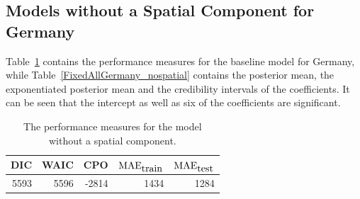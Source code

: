 \subsection{Models without a Spatial Component for Germany}\label{sec:nospatial_germany}
Table~\ref{allGermany_nospatial} contains the performance measures for the baseline model for Germany, while Table~\ref{FixedAllGermany_nospatial} contains the posterior mean, the exponentiated posterior mean and the credibility intervals of the coefficients. It can be seen that the intercept as well as six of the coefficients are significant.
\begin{table}[H] 
\caption{The performance measures for the model without a spatial component. \label{allGermany_nospatial}}
\begin{tabular}{r r r r r}
\toprule
\textbf{DIC}	& \textbf{WAIC} & \textbf{CPO} & \textbf{$\hbox{MAE}_{\hbox{train}}$} & \textbf{$\hbox{MAE}_{\hbox{test}}$}\\
\midrule
5593 & 5596 & -2814 & 1434 & 1284 \\
\bottomrule
\end{tabular}
\end{table}
